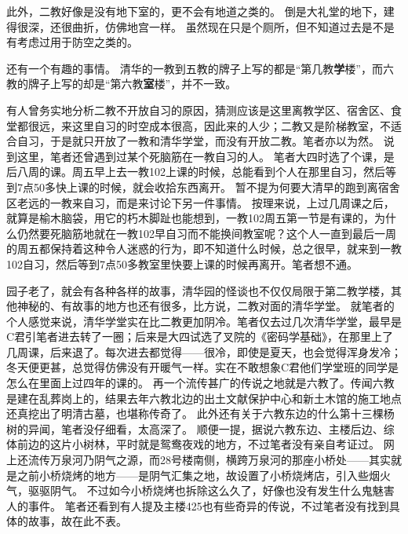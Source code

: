 此外，二教好像是没有地下室的，更不会有地道之类的。
倒是大礼堂的地下，建得很深，还很曲折，仿佛地宫一样。
虽然现在只是个厕所，但不知道过去是不是有考虑过用于防空之类的。

还有一个有趣的事情。
清华的一教到五教的牌子上写的都是“第几教\textbf{学}楼”，而六教的牌子上写的却是“第六教\textbf{室}楼”，并不一致。

有人曾务实地分析二教不开放自习的原因，猜测应该是这里离教学区、宿舍区、食堂都很远，来这里自习的时空成本很高，因此来的人少；二教又是阶梯教室，不适合自习，于是就只开放了一教和清华学堂，而没有开放二教。笔者亦以为然。
说到这里，笔者还曾遇到过某个死脑筋在一教自习的人。
笔者大四时选了个课，是后八周的课。周五早上去一教102上课的时候，总能看到个人在那里自习，然后等到7点50多快上课的时候，就会收拾东西离开。
暂不提为何要大清早的跑到离宿舍区老远的一教来自习，而是来讨论下另一件事情。
按理来说，上过几周课之后，就算是榆木脑袋，用它的朽木脚趾也能想到，一教102周五第一节是有课的，为什么仍然要死脑筋地就在一教102早自习而不能换间教室呢？这个人一直到最后一周的周五都保持着这种令人迷惑的行为，即不知道什么时候，总之很早，就来到一教102自习，然后等到7点50多教室里快要上课的时候再离开。笔者想不通。

园子老了，就会有各种各样的故事，清华园的怪谈也不仅仅局限于第二教学楼，其他神秘的、有故事的地方也还有很多，比方说，二教对面的清华学堂。
就笔者的个人感觉来说，清华学堂实在比二教更加阴冷。笔者仅去过几次清华学堂，最早是C君引笔者进去转了一圈；后来是大四试选了叉院的《密码学基础》，在那里上了几周课，后来退了。每次进去都觉得——很冷，即使是夏天，也会觉得浑身发冷；冬天便更甚，总觉得仿佛没有开暖气一样。实在不敢想象C君他们学堂班的同学是怎么在里面上过四年的课的。
再一个流传甚广的传说之地就是六教了。传闻六教是建在乱葬岗上的，结果去年六教北边的出土文献保护中心和新土木馆的施工地点还真挖出了明清古墓，也堪称传奇了。
此外还有关于六教东边的什么第十三棵杨树的异闻，笔者没仔细看，太高深了。
顺便一提，据说六教东边、主楼后边、综体前边的这片小树林，平时就是鸳鸯夜戏的地方，不过笔者没有亲自考证过。
网上还流传万泉河乃阴气之源，而28号楼南侧，横跨万泉河的那座小桥处——其实就是之前小桥烧烤的地方——是阴气汇集之地，故设置了小桥烧烤店，引入些烟火气，驱驱阴气。
不过如今小桥烧烤也拆除这么久了，好像也没有发生什么鬼魅害人的事件。
笔者还看到有人提及主楼425也有些奇异的传说，不过笔者没有找到具体的故事，故在此不表。

\nocite{ClassroomBuilding2_Leg1,ClassroomBuilding2_Leg2,ClassroomBuilding2_Info1_THU,ClassroomBuilding2_Info2_Wikipedia,ClassroomBuilding2_Anal1,ClassroomBuilding6_Leg1,WanquanRiver_Leg1}
\putbib
